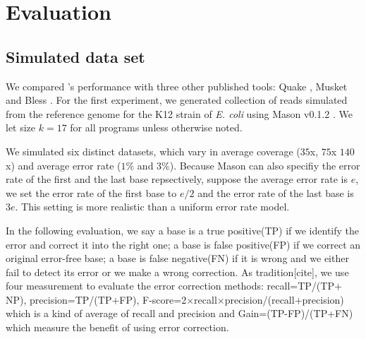 \documentclass[10pt]{article}
\begin{document}
\section*{Evaluation}
\subsection*{Simulated data set}

We compared \tool's performance with three other published tools: Quake \cite{kelley2010quake}, Musket\cite{liu2013musket} and Bless \cite{heo2014bless}.  For the first experiment, we generated collection of reads simulated from the reference genome for the K12 strain of \emph{E. coli} using Mason v0.1.2 \cite{holtgrewe2010mason}.  We let \kmer size $k=17$ for all programs unless otherwise noted.

We simulated six distinct datasets, which vary in average coverage ($35$x, $75$x $140$x) and average error rate ($1\%$ and $3\%$).  Because Mason can also specifiy the error rate of the first and the last base repsectively, suppose the average error rate is $e$, we set the error rate of the first base to $e/2$ and the error rate of the last base is $3e$. This setting is more realistic than a uniform error rate model. 

In the following evaluation, we say a base is a true positive(TP) if we identify the error and correct it into the right one; a base is false positive(FP) if we correct an original error-free base; a base is false negative(FN) if it is wrong and we either fail to detect its error or we make a wrong correction. As tradition[cite], we use four measurement to evaluate the error correction methods: recall=TP/(TP$+$NP), precision=TP/(TP$+$FP), F-score=2$\times$recall$\times$precision/(recall$+$precision) which is a kind of average of recall and precision and Gain=(TP-FP)/(TP+FN) which measure the benefit of using error correction.
\end{document}
